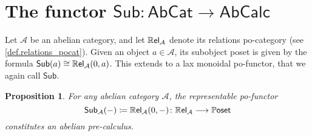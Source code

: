 \documentclass[11pt, oneside, article]{memoir}
\theoremstyle{plain}
\newtheorem{proposition}[theorem]{Proposition}
\theoremstyle{definition}
\theoremstyle{remark}
\newcommand{\cat}[1]{\mathcal{#1}}%
\newcommand{\Cat}[1]{{\mathsf{#1}}}%
\newcommand{\CCat}[1]{\mathbb{\StrLeft{#1}{1}}\Cat{\StrGobbleLeft{#1}{1}}}%
\newcommand{\Funr}[1]{\mathsf{#1}}%
\newcommand{\abcat}{\Cat{AbCat}}
\newcommand{\abcalc}{\Cat{AbCalc}}
\newcommand{\sub}{\Funr{Sub}}
\newcommand{\too}{\longrightarrow}
\newcommand{\rrel}[1]{\CCat{Rel}_{#1}}
\newcommand{\pposet}{\CCat{Poset}}
\begin{document}
\section{The functor $\sub\colon \abcat \to \abcalc$}

Let $\cat{A}$ be an abelian category, and let $\rrel{\cat{A}}$ denote its relations po-category (see \cref{def.relations_pocat}). Given an object $a\in\cat{A}$, its subobject poset is given by the formula $\sub(a)\cong\rrel{\cat{A}}(0,a)$. This extends to a lax monoidal po-functor, that we again call $\sub$.

\begin{proposition}\label{prop.sub_precalculus}
For any abelian category $\cat{A}$, the representable po-functor
\[\sub_{\cat{A}}(-)\coloneqq\rrel{\cat{A}}(0,-)\colon\rrel{\cat{A}}\too\pposet\]
constitutes an abelian pre-calculus. 
\end{proposition}
\end{document}
